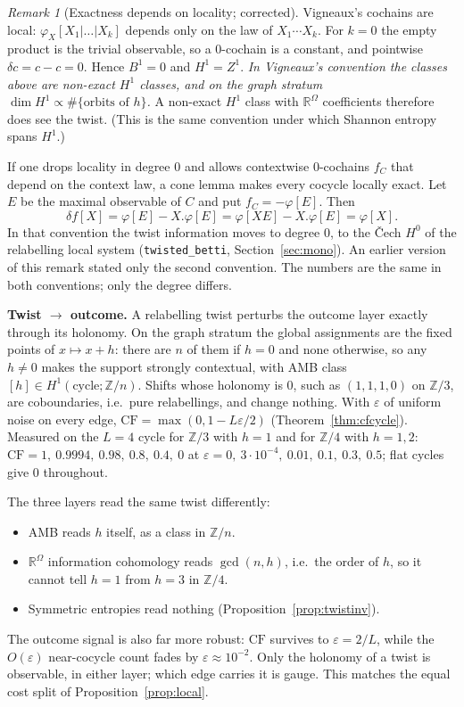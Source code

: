 \documentclass[11pt]{article}
\theoremstyle{definition}
\theoremstyle{remark}
\newtheorem{remark}[theorem]{Remark}
\newcommand{\Z}{\mathbb{Z}}
\newcommand{\R}{\mathbb{R}}
\newcommand{\CF}{\mathrm{CF}}
\begin{document}
\begin{remark}[Exactness depends on locality; corrected]
Vigneaux's cochains are local: $\varphi_X[X_1|\dots|X_k]$ depends only on the law of $X_1\cdots X_k$. For $k=0$ the empty product is the trivial observable, so a $0$-cochain is a constant, and pointwise $\delta c=c-c=0$. Hence $B^1=0$ and $H^1=Z^1$. \emph{In Vigneaux's convention the classes above are non-exact $H^1$ classes, and on the graph stratum $\dim H^1\propto\#\{\text{orbits of }h\}$.} A non-exact $H^1$ class with $\R^\Omega$ coefficients therefore does see the twist. (This is the same convention under which Shannon entropy spans $H^1$.)

If one drops locality in degree $0$ and allows contextwise $0$-cochains $f_C$ that depend on the context law, a cone lemma makes every cocycle locally exact. Let $E$ be the maximal observable of $C$ and put $f_C=-\varphi[E]$. Then
\[
\delta f[X]=\varphi[E]-X.\varphi[E]=\varphi[XE]-X.\varphi[E]=\varphi[X].
\]
In that convention the twist information moves to degree $0$, to the \v{C}ech $H^0$ of the relabelling local system (\texttt{twisted\_betti}, Section~\ref{sec:mono}). An earlier version of this remark stated only the second convention. The numbers are the same in both conventions; only the degree differs.
\end{remark}

\textbf{Twist $\to$ outcome.} A relabelling twist perturbs the outcome layer exactly through its holonomy. On the graph stratum the global assignments are the fixed points of $x\mapsto x+h$: there are $n$ of them if $h=0$ and none otherwise, so any $h\neq0$ makes the support strongly contextual, with AMB class $[h]\in H^1(\text{cycle};\Z/n)$. Shifts whose holonomy is $0$, such as $(1,1,1,0)$ on $\Z/3$, are coboundaries, i.e.\ pure relabellings, and change nothing. With $\varepsilon$ of uniform noise on every edge, $\CF=\max(0,1-L\varepsilon/2)$ (Theorem~\ref{thm:cfcycle}). Measured on the $L=4$ cycle for $\Z/3$ with $h=1$ and for $\Z/4$ with $h=1,2$: $\CF=1,\ 0.9994,\ 0.98,\ 0.8,\ 0.4,\ 0$ at $\varepsilon=0,\ 3\cdot10^{-4},\ 0.01,\ 0.1,\ 0.3,\ 0.5$; flat cycles give $0$ throughout.

The three layers read the same twist differently:
\begin{itemize}
  \item AMB reads $h$ itself, as a class in $\Z/n$.
  \item $\R^\Omega$ information cohomology reads $\gcd(n,h)$, i.e.\ the order of $h$, so it cannot tell $h=1$ from $h=3$ in $\Z/4$.
  \item Symmetric entropies read nothing (Proposition~\ref{prop:twistinv}).
\end{itemize}
The outcome signal is also far more robust: $\CF$ survives to $\varepsilon=2/L$, while the $O(\varepsilon)$ near-cocycle count fades by $\varepsilon\approx10^{-2}$. Only the holonomy of a twist is observable, in either layer; which edge carries it is gauge. This matches the equal cost split of Proposition~\ref{prop:local}.
\end{document}
